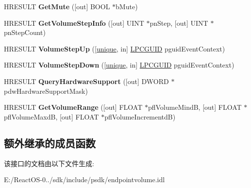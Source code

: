 \begin{DoxyCompactItemize}
H\+R\+E\+S\+U\+LT {\bfseries Get\+Mute} (\mbox{[}out\mbox{]} B\+O\+OL $\ast$b\+Mute)
\item 
\mbox{\label{interface_i_audio_endpoint_volume_ad868382e9be97582bb611818c11aecc4}} 
H\+R\+E\+S\+U\+LT {\bfseries Get\+Volume\+Step\+Info} (\mbox{[}out\mbox{]} U\+I\+NT $\ast$pn\+Step, \mbox{[}out\mbox{]} U\+I\+NT $\ast$pn\+Step\+Count)
\item 
\mbox{\label{interface_i_audio_endpoint_volume_ac77e4dc91702fe851cb5e6d07a61d46c}} 
H\+R\+E\+S\+U\+LT {\bfseries Volume\+Step\+Up} (\mbox{[}\hyperlink{interfaceunique}{unique}, in\mbox{]} \hyperlink{interface_g_u_i_d}{L\+P\+C\+G\+U\+ID} pguid\+Event\+Context)
\item 
\mbox{\label{interface_i_audio_endpoint_volume_a1fe1b225ae2700b36451807ac19e9adc}} 
H\+R\+E\+S\+U\+LT {\bfseries Volume\+Step\+Down} (\mbox{[}\hyperlink{interfaceunique}{unique}, in\mbox{]} \hyperlink{interface_g_u_i_d}{L\+P\+C\+G\+U\+ID} pguid\+Event\+Context)
\item 
\mbox{\label{interface_i_audio_endpoint_volume_a098b2cc100381b36f803b278e9ac0121}} 
H\+R\+E\+S\+U\+LT {\bfseries Query\+Hardware\+Support} (\mbox{[}out\mbox{]} D\+W\+O\+RD $\ast$pdw\+Hardware\+Support\+Mask)
\item 
\mbox{\label{interface_i_audio_endpoint_volume_ac81d865a4f518024ba8771b8ce01a770}} 
H\+R\+E\+S\+U\+LT {\bfseries Get\+Volume\+Range} (\mbox{[}out\mbox{]} F\+L\+O\+AT $\ast$pfl\+Volume\+MindB, \mbox{[}out\mbox{]} F\+L\+O\+AT $\ast$pfl\+Volume\+MaxdB, \mbox{[}out\mbox{]} F\+L\+O\+AT $\ast$pfl\+Volume\+IncrementdB)
\end{DoxyCompactItemize}
\subsection*{额外继承的成员函数}


该接口的文档由以下文件生成\+:\begin{DoxyCompactItemize}
\item 
E\+:/\+React\+O\+S-\/0../sdk/include/psdk/endpointvolume.\+idl\end{DoxyCompactItemize}
